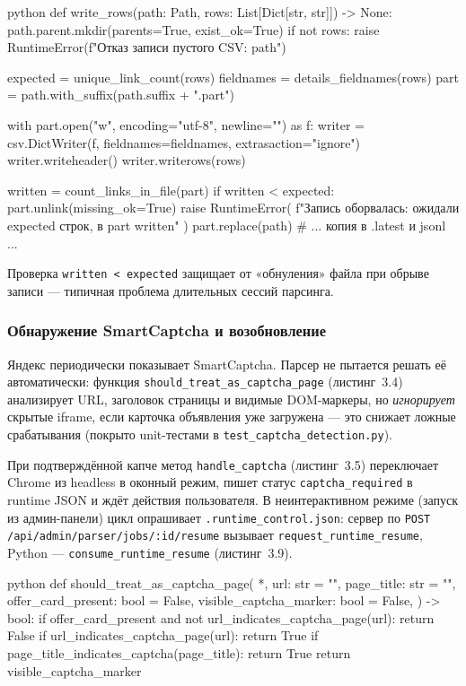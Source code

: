 \begin{singleminted}{python}
def write_rows(path: Path, rows: List[Dict[str, str]]) -> None:
    path.parent.mkdir(parents=True, exist_ok=True)
    if not rows:
        raise RuntimeError(f"Отказ записи пустого CSV: {path}")

    expected = unique_link_count(rows)
    fieldnames = details_fieldnames(rows)
    part = path.with_suffix(path.suffix + ".part")

    with part.open("w", encoding="utf-8", newline="") as f:
        writer = csv.DictWriter(f, fieldnames=fieldnames, extrasaction="ignore")
        writer.writeheader()
        writer.writerows(rows)

    written = count_links_in_file(part)
    if written < expected:
        part.unlink(missing_ok=True)
        raise RuntimeError(
            f"Запись оборвалась: ожидали {expected} строк, в part {written}"
        )
    part.replace(path)
    # ... копия в .latest и jsonl ...
\end{singleminted}
\label{lst:details-store}

Проверка \texttt{written < expected} защищает от «обнуления» файла при обрыве записи --- типичная проблема длительных сессий парсинга.

\subsubsection{Обнаружение SmartCaptcha и возобновление}

Яндекс периодически показывает SmartCaptcha. Парсер не пытается решать её автоматически: функция \texttt{should\_treat\_as\_captcha\_page} (листинг~3.4) анализирует URL, заголовок страницы и видимые DOM-маркеры, но \emph{игнорирует} скрытые iframe, если карточка объявления уже загружена --- это снижает ложные срабатывания (покрыто unit-тестами в \texttt{test\_captcha\_detection.py}).

При подтверждённой капче метод \texttt{handle\_captcha} (листинг~3.5) переключает Chrome из headless в оконный режим, пишет статус \texttt{captcha\_required} в runtime JSON и ждёт действия пользователя. В неинтерактивном режиме (запуск из админ-панели) цикл опрашивает \texttt{.runtime\_control.json}: сервер по \texttt{POST /api/admin/parser/jobs/:id/resume} вызывает \texttt{request\_runtime\_resume}, Python --- \texttt{consume\_runtime\_resume} (листинг~3.9).

\begin{singleminted}{python}
def should_treat_as_captcha_page(
    *,
    url: str = "",
    page_title: str = "",
    offer_card_present: bool = False,
    visible_captcha_marker: bool = False,
) -> bool:
    if offer_card_present and not url_indicates_captcha_page(url):
        return False
    if url_indicates_captcha_page(url):
        return True
    if page_title_indicates_captcha(page_title):
        return True
    return visible_captcha_marker
\end{singleminted}
\label{lst:captcha-detect}

